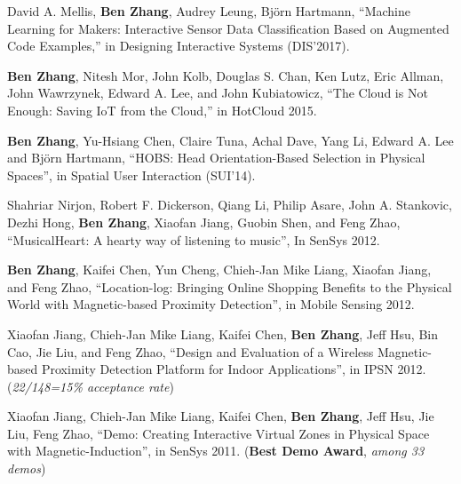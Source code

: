 
\paragraphstyle

David A. Mellis, {\bf Ben Zhang}, Audrey Leung, Bj\"orn Hartmann, ``Machine
Learning for Makers: Interactive Sensor Data Classification Based on Augmented
Code Examples,'' in Designing Interactive Systems (DIS'2017).

{\bf Ben Zhang}, Nitesh Mor, John Kolb, Douglas S. Chan, Ken Lutz, Eric
Allman, John Wawrzynek, Edward A. Lee, and John Kubiatowicz, ``The Cloud is
Not Enough: Saving IoT from the Cloud,'' in HotCloud 2015.

{\bf Ben Zhang}, Yu-Hsiang Chen, Claire Tuna, Achal Dave, Yang Li, Edward A. Lee
and Bj\"orn Hartmann, ``HOBS: Head Orientation-Based Selection in Physical
Spaces'', in Spatial User Interaction (SUI'14).

Shahriar Nirjon, Robert F. Dickerson, Qiang Li, Philip Asare, John A. Stankovic,
Dezhi Hong, {\bf Ben Zhang}, Xiaofan Jiang, Guobin Shen, and Feng Zhao,
``MusicalHeart: A hearty way of listening to music'', In SenSys 2012.

{\bf Ben Zhang}, Kaifei Chen, Yun Cheng, Chieh-Jan Mike Liang, Xiaofan Jiang,
and Feng Zhao, ``Location-log: Bringing Online Shopping Benefits to the Physical
World with Magnetic-based Proximity Detection'', in Mobile Sensing 2012.

Xiaofan Jiang, Chieh-Jan Mike Liang, Kaifei Chen, {\bf Ben Zhang}, Jeff Hsu, Bin
Cao, Jie Liu, and Feng Zhao, ``Design and Evaluation of a Wireless
Magnetic-based Proximity Detection Platform for Indoor Applications'', in IPSN
2012. ({\it 22/148=15\% acceptance rate})

Xiaofan Jiang, Chieh-Jan Mike Liang, Kaifei Chen, {\bf Ben Zhang}, Jeff Hsu, Jie
Liu, Feng Zhao, ``Demo: Creating Interactive Virtual Zones in Physical Space
with Magnetic-Induction'', in SenSys 2011. ({\bf Best Demo Award}, {\it among 33
  demos})

